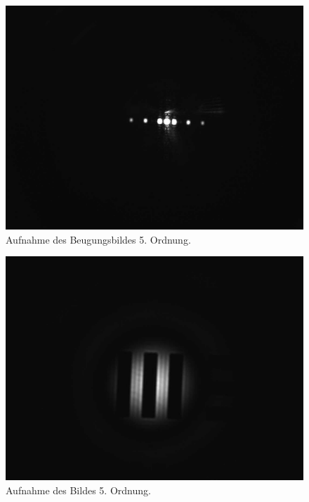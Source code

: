 \documentclass{article}
\begin{document}
\begin{minipage}[t]{.45\textwidth}
\begin{figure}[H]
\includegraphics[scale=0.1]{tm/Beugungsbild_5.jpg}
\caption{Aufnahme des Beugungsbildes 5. Ordnung.}
\label{fig:bbild_5_tm}
\end{figure}
\end{minipage}
\hfill
\noindent
\begin{minipage}[t]{.45\textwidth}
\begin{figure}[H]
\includegraphics[scale=0.1]{tm/Bild_5.jpg}
\caption{Aufnahme des Bildes 5. Ordnung.}
\label{fig:bild_5_tm}
\end{figure}
\end{minipage}
\end{document}
